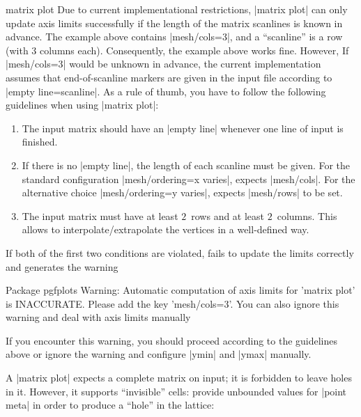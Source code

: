 {\begin{plottype}[/pgfplots]{matrix plot}
    Due to current implementational restrictions, |matrix plot| can only update
    axis limits successfully if the length of the matrix scanlines is known in
    advance. The example above contains |mesh/cols=3|, and a ``scanline'' is a
    row (with $3$ columns each). Consequently, the example above works fine.
    However, If |mesh/cols=3| would be unknown in advance, the current
    implementation assumes that end-of-scanline markers are given in the input
    file according to |empty line=scanline|. As a rule of thumb, you have to
    follow the following guidelines when using |matrix plot|:
    \begin{enumerate}
        \item The input matrix should have an |empty line| whenever one line
            of input is finished.
        \item If there is no |empty line|, the length of each scanline must
            be given. For the standard configuration
            |mesh/ordering=x varies|, \PGFPlots{} expects |mesh/cols|. For the
            alternative choice |mesh/ordering=y varies|, \PGFPlots{} expects
            |mesh/rows| to be set.
        \item The input matrix must have at least $2$~rows and at least
            $2$~columns. This allows \PGFPlots{} to interpolate/extrapolate
            the vertices in a well-defined way.
    \end{enumerate}
    If both of the first two conditions are violated, \PGFPlots{} fails to
    update the limits correctly and generates the warning
\begin{codeexample}
Package pgfplots Warning: Automatic computation of axis limits for 'matrix plot' is INACCURATE.
Please add the key 'mesh/cols=3'. You can also ignore this warning and deal with axis limits manually
\end{codeexample}
    If you encounter this warning, you should proceed according to the
    guidelines above or ignore the warning and configure |ymin| and |ymax|
    manually.

    A |matrix plot| expects a complete matrix on input; it is forbidden to
    leave holes in it. However, it supports ``invisible'' cells: provide
    unbounded values for |point meta| in order to produce a ``hole'' in the
    lattice:
\begin{codeexample}[]
\end{codeexample}
\end{plottype}}
